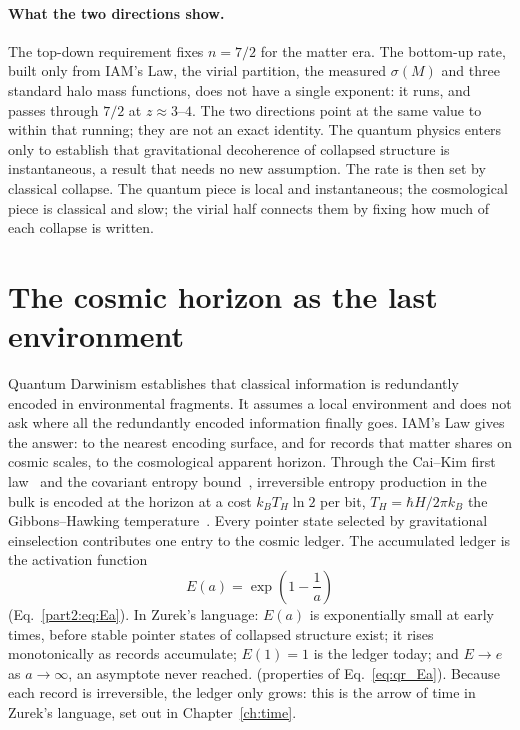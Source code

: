 \paragraph{What the two directions show.} The top-down requirement fixes $n=7/2$ for the matter era. The bottom-up rate, built only from IAM's Law, the
virial partition, the measured $\sigma(M)$ and three standard halo mass functions, does not have a single exponent: it runs, and passes through $7/2$ at
$z\approx3$--$4$. The two directions point at the same value to within that running; they are not an exact identity. \calc{} The quantum physics enters
only to establish that gravitational decoherence of collapsed structure is instantaneous, a result that needs no new assumption. The rate is then set by
classical collapse. The quantum piece is local and instantaneous; the cosmological piece is classical and slow; the virial half connects them by fixing
how much of each collapse is written. \interp

\section{The cosmic horizon as the last environment}\label{sec:qr_horizon}
Quantum Darwinism establishes that classical information is redundantly encoded in environmental fragments. It assumes a local environment and does not
ask where all the redundantly encoded information finally goes. IAM's Law gives the answer: to the nearest encoding surface, and for records that matter
shares on cosmic scales, to the cosmological apparent horizon. Through the Cai--Kim first law~\cite{CaiKim2005} and the covariant entropy
bound~\cite{Bousso2002}, irreversible entropy production in the bulk is encoded at the horizon at a cost $k_BT_H\ln2$ per bit, $T_H=\hbar H/2\pi k_B$
the Gibbons--Hawking temperature~\cite{GibbonsHawking1977}. Every pointer state selected by gravitational einselection contributes one entry to the
cosmic ledger. \interp{} The accumulated ledger is the activation function
\begin{equation}
E(a)=\exp\!\left(1-\frac1a\right)\label{eq:qr_Ea}
\end{equation}
(Eq.~\ref{part2:eq:Ea}). In Zurek's language: $E(a)$ is exponentially small at early times, before stable pointer states of collapsed structure exist;
it rises monotonically as records accumulate; $E(1)=1$ is the ledger today; and $E\to e$ as $a\to\infty$, an asymptote never reached. \derived{} (properties
of Eq.~\ref{eq:qr_Ea}). Because each record is irreversible, the ledger only grows: this is the arrow of time in Zurek's language, set out in
Chapter~\ref{ch:time}. \interp

